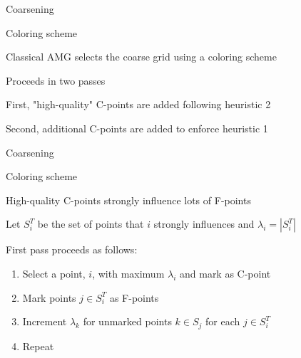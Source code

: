 \documentclass[18pt,xcolor=table]{beamer}
\begin{document}
\begin{frame}{Coarsening}
\begin{block}{Coloring scheme}
\bit
\item Classical AMG selects the coarse grid using a coloring scheme
\item Proceeds in two passes 
\item First, "high-quality" C-points are added following heuristic 2
\item Second, additional C-points are added to enforce heuristic 1
\eit
\end{block}
\end{frame}

\begin{frame}{Coarsening}
\begin{block}{Coloring scheme}
\bit
\item High-quality C-points strongly influence lots of F-points
\item Let $S^T_i$ be the set of points that $i$ strongly influences and $\lambda_i = |S^T_i|$
\item First pass proceeds as follows:
\begin{enumerate}
\item Select a point, $i$, with maximum $\lambda_i$ and mark as C-point
\item Mark points $j\in S^T_i$ as F-points
\item Increment $\lambda_k$ for unmarked points $k\in S_j$ for each $j\in S^T_i$
\item Repeat
\end{enumerate}
\eit
\end{block}
\end{frame}
\end{document}
